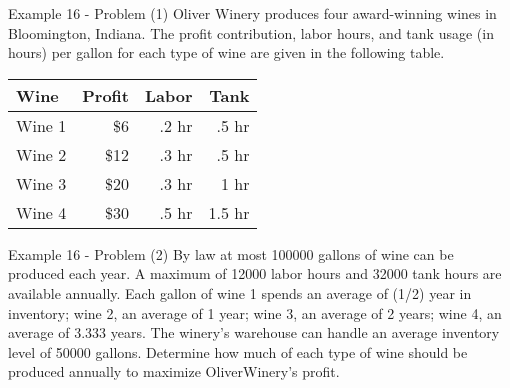 \begin{frame}{Example 16 - Problem (1)}
Oliver Winery produces four award-winning wines in Bloomington, Indiana. The
profit contribution, labor hours, and tank usage (in hours) per gallon for each
type of wine are given in the following table.

\begin{center}
\begin{tabular}{lrrr}
\hline
  \cellcolor{gray90}\textbf{Wine}
& \cellcolor{gray90}\textbf{Profit}
& \cellcolor{gray90}\textbf{Labor}
& \cellcolor{gray90}\textbf{Tank} \\
\hline
Wine 1 &  \$6 & .2 hr &  .5 hr \\
Wine 2 & \$12 & .3 hr &  .5 hr \\
Wine 3 & \$20 & .3 hr & 1   hr \\
Wine 4 & \$30 & .5 hr & 1.5 hr \\
\hline
\end{tabular}
\end{center}

\end{frame}

\begin{frame}{Example 16 - Problem (2)}
By law at most 100000 gallons of wine can be produced each year. A maximum of
12000 labor hours and 32000 tank hours are available annually. Each gallon of
wine 1 spends an average of (1/2) year in inventory; wine 2, an average of 1
year; wine 3, an average of 2 years; wine 4, an average of 3.333 years. The
winery's warehouse can handle an average inventory level of 50000 gallons.
Determine how much of each type of wine should be produced annually to maximize
OliverWinery's profit.
\end{frame}
